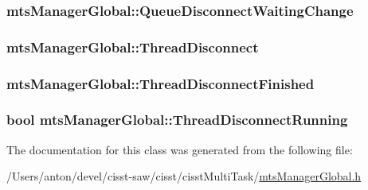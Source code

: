 \subsubsection[{Queue\+Disconnect\+Waiting\+Change}]{ mts\+Manager\+Global\+::\+Queue\+Disconnect\+Waiting\+Change\hspace{0.3cm}{\ttfamily [protected]}}\label{classmts_manager_global_a900d74d93bb72e9420cd6094104c4c4e}
\hypertarget{classmts_manager_global_ac2dfc08c1931e1128145317e2499112f}{}
\subsubsection[{Thread\+Disconnect}]{ mts\+Manager\+Global\+::\+Thread\+Disconnect\hspace{0.3cm}{\ttfamily [protected]}}\label{classmts_manager_global_ac2dfc08c1931e1128145317e2499112f}
\hypertarget{classmts_manager_global_a97940aadb7eeb7697a4174a929483def}{}
\subsubsection[{Thread\+Disconnect\+Finished}]{ mts\+Manager\+Global\+::\+Thread\+Disconnect\+Finished\hspace{0.3cm}{\ttfamily [protected]}}\label{classmts_manager_global_a97940aadb7eeb7697a4174a929483def}
\hypertarget{classmts_manager_global_a37a0b3f81f160ab240bb99924f52bf26}{}
\subsubsection[{Thread\+Disconnect\+Running}]{\setlength{\rightskip}{0pt plus 5cm}bool mts\+Manager\+Global\+::\+Thread\+Disconnect\+Running\hspace{0.3cm}{\ttfamily [protected]}}\label{classmts_manager_global_a37a0b3f81f160ab240bb99924f52bf26}


The documentation for this class was generated from the following file\+:\begin{DoxyCompactItemize}
\item 
/\+Users/anton/devel/cisst-\/saw/cisst/cisst\+Multi\+Task/\hyperlink{mts_manager_global_8h}{mts\+Manager\+Global.\+h}\end{DoxyCompactItemize}
